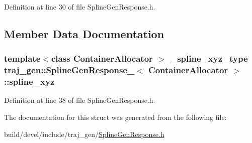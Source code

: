 Definition at line 30 of file Spline\+Gen\+Response.\+h.



\subsection{Member Data Documentation}
\subsubsection[{\texorpdfstring{spline\+\_\+xyz}{spline_xyz}}]{\setlength{\rightskip}{0pt plus 5cm}template$<$class Container\+Allocator $>$ {\bf \+\_\+spline\+\_\+xyz\+\_\+type} {\bf traj\+\_\+gen\+::\+Spline\+Gen\+Response\+\_\+}$<$ Container\+Allocator $>$\+::spline\+\_\+xyz}\hypertarget{structtraj__gen_1_1_spline_gen_response___a65441baa1583015577395779f71981c9}{}\label{structtraj__gen_1_1_spline_gen_response___a65441baa1583015577395779f71981c9}


Definition at line 38 of file Spline\+Gen\+Response.\+h.



The documentation for this struct was generated from the following file\+:\begin{DoxyCompactItemize}
\item 
build/devel/include/traj\+\_\+gen/\hyperlink{_spline_gen_response_8h}{Spline\+Gen\+Response.\+h}\end{DoxyCompactItemize}
